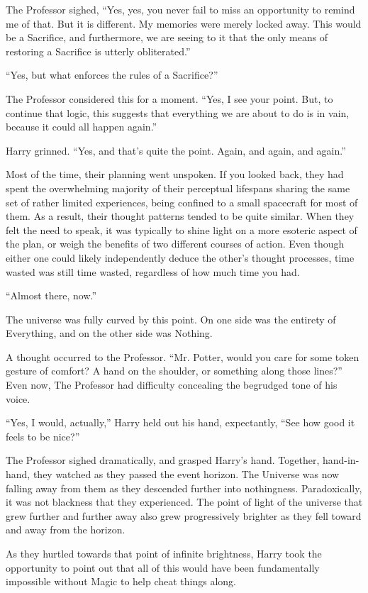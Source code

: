 The Professor sighed, “Yes, yes, you never fail to miss an opportunity to remind me of that. But it is different. My memories were merely locked away. This would be a Sacrifice, and furthermore, we are seeing to it that the only means of restoring a Sacrifice is utterly obliterated.”

“Yes, but what enforces the rules of a Sacrifice?”

The Professor considered this for a moment. “Yes, I see your point. But, to continue that logic, this suggests that everything we are about to do is in vain, because it could all happen again.”

Harry grinned. “Yes, and that’s quite the point. Again, and again, and again.”

Most of the time, their planning went unspoken. If you looked back, they had spent the overwhelming majority of their perceptual lifespans sharing the same set of rather limited experiences, being confined to a small spacecraft for most of them. As a result, their thought patterns tended to be quite similar. When they felt the need to speak, it was typically to shine light on a more esoteric aspect of the plan, or weigh the benefits of two different courses of action. Even though either one could likely independently deduce the other’s thought processes, time wasted was still time wasted, regardless of how much time you had.

“Almost there, now.”

The universe was fully curved by this point. On one side was the entirety of Everything, and on the other side was Nothing.

A thought occurred to the Professor. “Mr. Potter, would you care for some token gesture of comfort? A hand on the shoulder, or something along those lines?” Even now, The Professor had difficulty concealing the begrudged tone of his voice.

“Yes, I would, actually,” Harry held out his hand, expectantly, “See how good it feels to be nice?”

The Professor sighed dramatically, and grasped Harry’s hand. Together, hand-in-hand, they watched as they passed the event horizon. The Universe was now falling away from them as they descended further into nothingness. Paradoxically, it was not blackness that they experienced. The point of light of the universe that grew further and further away also grew progressively brighter as they fell toward and away from the horizon.

As they hurtled towards that point of infinite brightness, Harry took the opportunity to point out that all of this would have been fundamentally impossible without Magic to help cheat things along.

